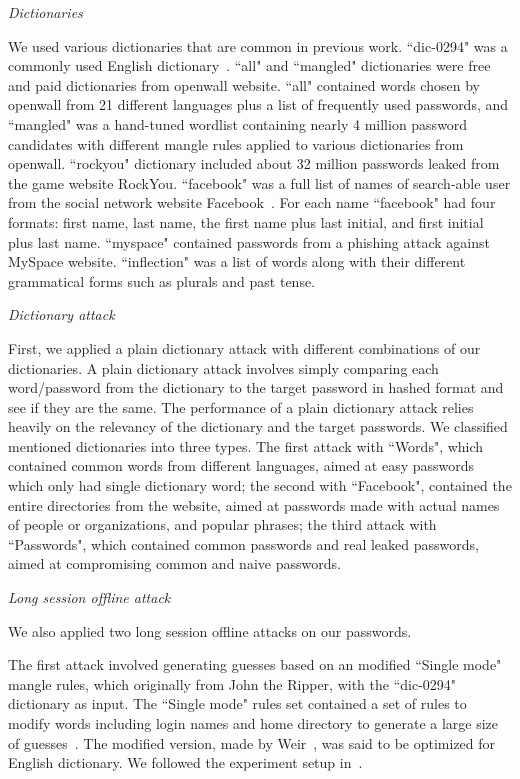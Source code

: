 \documentclass[conference]{IEEEtran}
\begin{document}
\textit{Dictionaries}

We used various dictionaries that are common in previous work. ``dic-0294" was a commonly used English dictionary~\cite{outpost9}. ``all" and ``mangled" dictionaries were free and paid dictionaries from openwall website\footnotemark.  ``all" contained words chosen by openwall from 21 different languages plus a list of frequently used passwords, and ``mangled" was a hand-tuned wordlist containing nearly 4 million password candidates with different mangle rules applied to various dictionaries from openwall. ``rockyou" dictionary included about 32 million passwords leaked from the game website RockYou. ``facebook" was a full list of names of search-able user from the social network website Facebook~\cite{facebookindex2010}. For each name ``facebook" had four formats: first name, last name, the first name plus last initial, and first initial plus last name. ``myspace" contained passwords from a phishing attack against MySpace website. ``inflection"\footnotemark {} was a list of words along with their different grammatical forms such as plurals and past tense. 

\textit{Dictionary attack}

First, we applied a plain dictionary attack with different combinations of our dictionaries. A plain dictionary attack involves simply comparing each word/password from the dictionary to the target password in hashed format and see if they are the same. The performance of a plain dictionary attack relies heavily on the relevancy of the dictionary and the target passwords. We classified mentioned dictionaries into three types. The first attack with ``Words", which contained common words from different languages, aimed at easy passwords which only had single dictionary word; the second with ``Facebook", contained the entire directories from the website, aimed at passwords made with actual names of people or organizations, and popular phrases; the third attack with ``Passwords", which contained common passwords and real leaked passwords, aimed at compromising common and naive passwords.

\textit{Long session offline attack}

We also applied two long session offline attacks on our passwords.

The first attack involved generating guesses based on an modified ``Single mode" mangle rules, which originally from John the Ripper, with the ``dic-0294" dictionary as input. The ``Single mode" rules set contained a set of rules to modify words including login names and home directory to generate a large size of guesses~\cite{johntheripper}. The modified version, made by Weir~\cite{jtrmodifiedsingle2010}, was said to be optimized for English dictionary. We followed the experiment setup in~\cite{Weir:2010:TMP:1866307.1866327}. 
\end{document}
